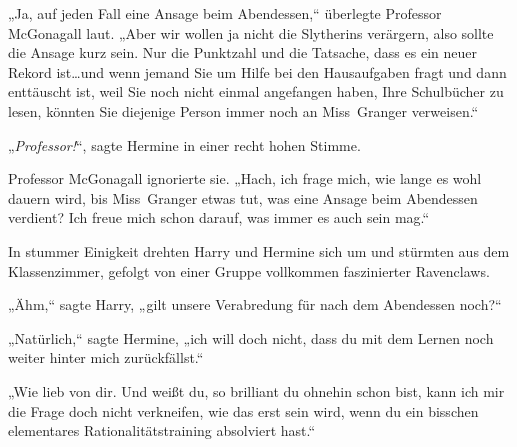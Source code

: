 „Ja, auf jeden Fall eine Ansage beim Abendessen,“ überlegte Professor McGonagall laut. „Aber wir wollen ja nicht die Slytherins verärgern, also sollte die Ansage kurz sein. Nur die Punktzahl und die Tatsache, dass es ein neuer Rekord ist…und wenn jemand Sie um Hilfe bei den Hausaufgaben fragt und dann enttäuscht ist, weil Sie noch nicht einmal angefangen haben, Ihre Schulbücher zu lesen, könnten Sie diejenige Person immer noch an Miss~Granger verweisen.“

„\emph{Professor!}“, sagte Hermine in einer recht hohen Stimme.

Professor McGonagall ignorierte sie. „Hach, ich frage mich, wie lange es wohl dauern wird, bis Miss~Granger etwas tut, was eine Ansage beim Abendessen verdient? Ich freue mich schon darauf, was immer es auch sein mag.“

In stummer Einigkeit drehten Harry und Hermine sich um und stürmten aus dem Klassenzimmer, gefolgt von einer Gruppe vollkommen faszinierter Ravenclaws.

„Ähm,“ sagte Harry, „gilt unsere Verabredung für nach dem Abendessen noch?“

„Natürlich,“ sagte Hermine, „ich will doch nicht, dass du mit dem Lernen noch weiter hinter mich zurückfällst.“

„Wie lieb von dir. Und weißt du, so brilliant du ohnehin schon bist, kann ich mir die Frage doch nicht verkneifen, wie das erst sein wird, wenn du ein bisschen elementares Rationalitätstraining absolviert hast.“

